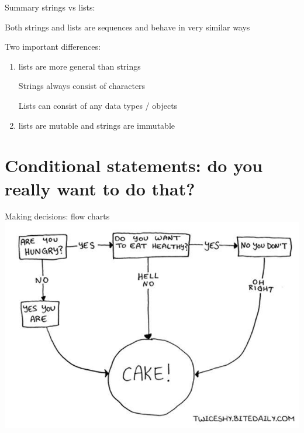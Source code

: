 \documentclass[aspectratio=169,usenames,dvipsnames]{beamer}
\begin{document}
\begin{frame}[fragile]{Summary}
strings vs lists:

Both strings and lists are sequences and behave in very similar ways

Two important differences:
\begin{enumerate}
    \item lists are more general than strings

        Strings always consist of characters

        Lists can consist of any data types / objects

    \item lists are mutable and strings are immutable
\end{enumerate}
\end{frame}







\section{Conditional statements: do you really want to do that?}
\frame{\tableofcontents[currentsection]}

\begin{frame}{Making decisions: flow charts}
    \includegraphics[height=0.8\textheight]{fig/flowchart}
\end{frame}
\end{document}
